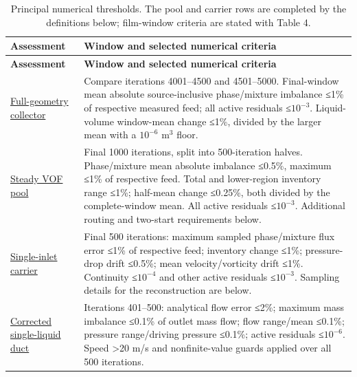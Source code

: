 \begin{longtable}{@{}>{\raggedright\arraybackslash}p{0.29000000\dimexpr\linewidth-2\tabcolsep\relax}>{\raggedright\arraybackslash}p{0.71000000\dimexpr\linewidth-2\tabcolsep\relax}@{}}
\caption{Principal numerical thresholds. The pool and carrier rows are completed by the definitions below; film-window criteria are stated with Table 4.}\label{tab:table-B.2}\\
\toprule
\textbf{Assessment} & \textbf{Window and selected numerical criteria} \\
\midrule
\endfirsthead
\toprule
\textbf{Assessment} & \textbf{Window and selected numerical criteria} \\
\midrule
\endhead
\href{https://github.com/Shuhei-uni/P4P_knowledgeWiki/blob/main/Project/experiments/phase-07b-full-geometry-liquid-removal/s040-collector/setup.md}{Full-geometry collector} & Compare iterations 4001--4500 and 4501--5000. Final-window mean absolute source-inclusive phase/mixture imbalance ≤1\% of respective measured feed; all active residuals ≤\(10^{-3}\). Liquid-volume window-mean change ≤1\%, divided by the larger mean with a \(10^{-6}\) m\(^3\) floor. \\
\href{https://github.com/Shuhei-uni/P4P_knowledgeWiki/blob/main/Project/experiments/phase-09-steady-vof-pool/setup.md}{Steady VOF pool} & Final 1000 iterations, split into 500-iteration halves. Phase/mixture mean absolute imbalance ≤0.5\%, maximum ≤1\% of respective feed. Total and lower-region inventory range ≤1\%; half-mean change ≤0.25\%, both divided by the complete-window mean. All active residuals ≤\(10^{-3}\). Additional routing and two-start requirements below. \\
\href{https://github.com/Shuhei-uni/P4P_knowledgeWiki/blob/main/Project/experiments/phase-10-single-inlet-mesh-convergence/setup.md}{Single-inlet carrier} & Final 500 iterations: maximum sampled phase/mixture flux error ≤1\% of respective feed; inventory change ≤1\%; pressure-drop drift ≤0.5\%; mean velocity/vorticity drift ≤1\%. Continuity ≤\(10^{-4}\) and other active residuals ≤\(10^{-3}\). Sampling details for the reconstruction are below. \\
\href{https://github.com/Shuhei-uni/P4P_knowledgeWiki/blob/main/Project/experiments/phase-09-steady-vof-pool/follow-on-diagnostics/drainage-boundary-verification/setup.md}{Corrected single-liquid duct} & Iterations 401--500: analytical flow error ≤2\%; maximum mass imbalance ≤0.1\% of outlet mass flow; flow range/mean ≤0.1\%; pressure range/driving pressure ≤0.1\%; active residuals ≤\(10^{-6}\). Speed \textgreater20 m/s and nonfinite-value guards applied over all 500 iterations. \\
\bottomrule
\end{longtable}

